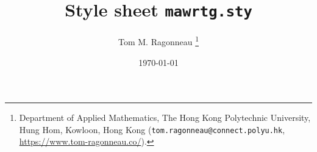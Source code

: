 \documentclass{article}
\title{Style sheet \texttt{mawrtg.sty}}
\author{Tom M. Ragonneau%
    \thanks{%
        Department of Applied Mathematics,
        The Hong Kong Polytechnic University,
        Hung Hom, Kowloon, Hong Kong
        (\texttt{tom.ragonneau@connect.polyu.hk},
        \url{https://www.tom-ragonneau.co/}).
    }
}
\date{\today}
\begin{document}
\maketitle

\nocite{*}
\printbibliography
\end{document}
